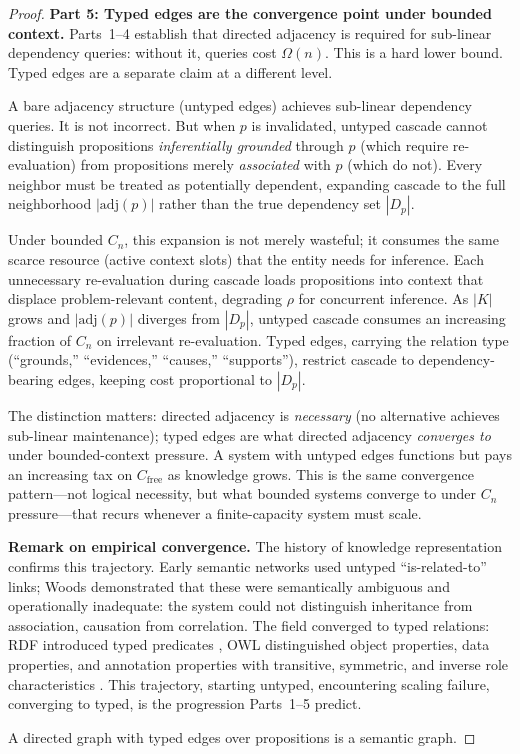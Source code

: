 \documentclass[11pt]{article}
\theoremstyle{definition}
\begin{document}
\begin{proof}
\textbf{Part 5: Typed edges are the convergence point under bounded
context.}
Parts~1--4 establish that directed adjacency is required for sub-linear
dependency queries: without it, queries cost $\Omega(n)$. This is a hard
lower bound. Typed edges are a separate claim at a different level.

A bare adjacency structure (untyped edges) achieves sub-linear
dependency queries. It is not incorrect. But when $p$ is invalidated,
untyped cascade cannot distinguish propositions \emph{inferentially
grounded} through $p$ (which require re-evaluation) from propositions
merely \emph{associated} with $p$ (which do not). Every neighbor must
be treated as potentially dependent, expanding cascade to the full
neighborhood $|\mathrm{adj}(p)|$ rather than the true dependency set
$|D_p|$.

Under bounded $C_n$, this expansion is not merely wasteful; it
consumes the same scarce resource (active context slots) that the
entity needs for inference. Each unnecessary re-evaluation during
cascade loads propositions into context that displace
problem-relevant content, degrading $\rho$ for concurrent inference.
As $|K|$ grows and $|\mathrm{adj}(p)|$ diverges from $|D_p|$, untyped
cascade consumes an increasing fraction of $C_n$ on irrelevant
re-evaluation. Typed edges, carrying the relation type (``grounds,''
``evidences,'' ``causes,'' ``supports''), restrict cascade to
dependency-bearing edges, keeping cost proportional to $|D_p|$.

The distinction matters: directed adjacency is \emph{necessary} (no
alternative achieves sub-linear maintenance); typed edges are what
directed adjacency \emph{converges to} under bounded-context
pressure. A system with untyped edges functions but pays an
increasing tax on $C_{\mathrm{free}}$ as knowledge grows. This is
the same convergence pattern---not logical necessity, but what
bounded systems converge to under $C_n$ pressure---that recurs
whenever a finite-capacity system must scale.

\textbf{Remark on empirical convergence.}
The history of knowledge representation confirms this trajectory.
Early semantic networks used untyped ``is-related-to'' links;
Woods \cite{Woods1975} demonstrated that these were semantically
ambiguous and operationally inadequate: the system could not
distinguish inheritance from association, causation from correlation.
The field converged to typed relations: RDF introduced typed
predicates \cite{BernersLee2001}, OWL distinguished object properties,
data properties, and annotation properties with transitive, symmetric,
and inverse role characteristics \cite{BaaderCalvaneseEtAl2003}.
This trajectory, starting untyped, encountering scaling failure,
converging to typed, is the progression Parts~1--5 predict.

A directed graph with typed edges over propositions is a semantic graph.
\end{proof}
\end{document}

